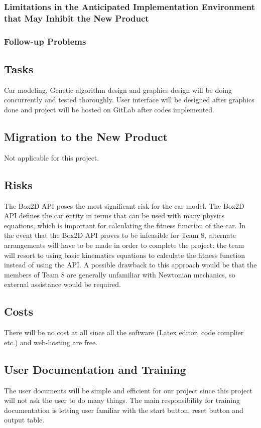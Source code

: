 \documentclass[12pt, titlepage]{article}
\begin{document}
\subsubsection{Limitations in the Anticipated Implementation Environment that May Inhibit the New Product}

\subsubsection{Follow-up Problems}

\subsection{Tasks}
Car modeling, Genetic algorithm design and graphics design will be doing 
concurrently and tested thoroughly. User interface will be designed after 
graphics done and project will be hosted on GitLab after codes implemented.

\subsection{Migration to the New Product}
Not applicable for this project.

\subsection{Risks}
The Box2D API poses the most signiﬁcant risk for the car model. The Box2D 
API deﬁnes the car entity in terms that can be used with many physics 
equations, which is important for calculating the ﬁtness function of the 
car. In the event that the Box2D API proves to be infeasible for Team 8, 
alternate arrangements will have to be made in order to complete the
project: the team will resort to using basic kinematics equations to calculate 
the ﬁtness function instead of using the API. A possible drawback to this 
approach would be that the members of Team 8 are generally unfamiliar with 
Newtonian mechanics, so external assistance would be required. 

\subsection{Costs}
There will be no cost at all since all the software (Latex editor, code 
complier etc.) and web-hosting are free. 

\subsection{User Documentation and Training}
The user documents will be simple and efficient for our project since this 
project will not ask the user to do many things. The main responsibility for 
training documentation is letting user familiar with the start button, reset 
button and output table.
\end{document}
